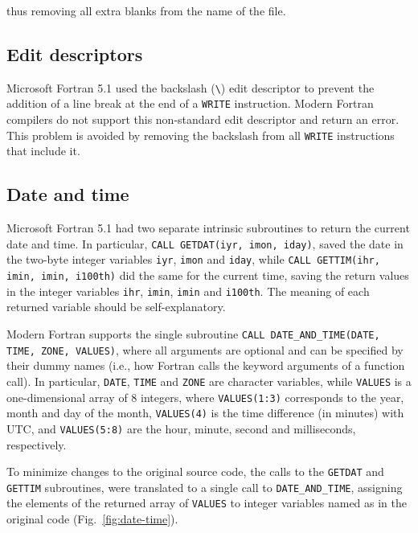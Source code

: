 thus removing all extra blanks from the name of the file.



\subsection{Edit descriptors}

Microsoft Fortran 5.1 used the backslash (\texttt{\textbackslash{}}) edit descriptor to prevent the addition of a line break at the end of a \texttt{WRITE} instruction.
Modern Fortran compilers do not support this  non-standard edit descriptor and return an error. This problem is avoided by removing the backslash from all \texttt{WRITE} instructions that include it.



\subsection{Date and time}

Microsoft Fortran 5.1 had two separate intrinsic subroutines to return the current date and time.
In particular, \texttt{CALL GETDAT(iyr, imon, iday)}, saved the date in the two-byte integer variables \texttt{iyr}, \texttt{imon} and \texttt{iday}, while \texttt{CALL GETTIM(ihr, imin, imin, i100th)} did the same for the current time, saving the return values in the integer variables \texttt{ihr}, \texttt{imin}, \texttt{imin} and \texttt{i100th}. The meaning of each returned variable should be self-explanatory.

Modern Fortran supports the single subroutine \texttt{CALL DATE\_AND\_TIME(DATE, TIME, ZONE, VALUES)}, where all arguments are optional and can be specified by their dummy names (i.e., how Fortran calls the keyword arguments of a function call). 
In particular, \texttt{DATE}, \texttt{TIME} and \texttt{ZONE} are character variables, while \texttt{VALUES} is a one-dimensional array of 8 integers, where \texttt{VALUES(1:3)} corresponds to the year, month and day of the month, \texttt{VALUES(4)} is the time difference (in minutes) with UTC, and \texttt{VALUES(5:8)} are the hour, minute, second and milliseconds, respectively.

To minimize changes to the original source code, the calls to the \texttt{GETDAT} and \texttt{GETTIM} subroutines, were translated to a single call to \texttt{DATE\_AND\_TIME}, assigning the elements of the returned array of \texttt{VALUES} to integer variables named as in the original code (Fig.~\ref{fig:date-time}).



